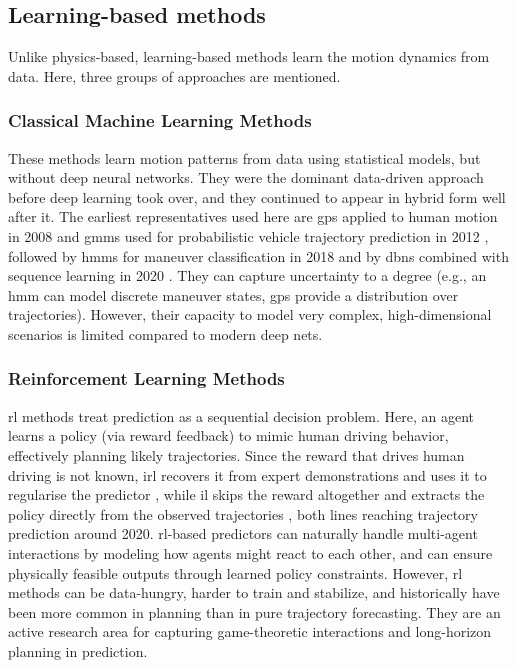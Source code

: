 \subsection{Learning-based methods}
\label{subsec:sota-learning}

Unlike physics-based, learning-based methods learn the motion dynamics from data.
Here, three groups of approaches are mentioned. 

\subsubsection{Classical Machine Learning Methods}
\label{subsec:sota-classical-ml}
These methods learn motion patterns from data using statistical models, but without deep
neural networks. They were the dominant data-driven approach before deep learning took over, and they
continued to appear in hybrid form well after it. The earliest representatives used here are \acp{gp}
applied to human motion in 2008 \cite{Wang2008GPDM} and \acp{gmm} used for probabilistic vehicle
trajectory prediction in 2012 \cite{Wiest2012GMM}, followed by \acp{hmm} for maneuver classification in
2018 \cite{Deo2018Maneuver} and by \acp{dbn} combined with sequence learning in 2020
\cite{Li2020Pedestrian}. They can capture
uncertainty to a degree (e.g., an \ac{hmm} can model discrete maneuver states, \acp{gp}
provide a distribution over trajectories). However, their
capacity to model very complex, high-dimensional scenarios is limited compared to modern
deep nets.

\subsubsection{Reinforcement Learning Methods}
\label{subsec:sota-rl}

\Ac{rl} methods treat prediction as a sequential decision problem. Here, an agent learns a
policy (via reward feedback) to mimic human driving behavior, effectively planning likely
trajectories. Since the reward that drives human driving is not known, \ac{irl}
recovers it from expert demonstrations and uses it to regularise the predictor \cite{Choi2020IRL}, while
\ac{il} skips the reward altogether and extracts the policy directly from the observed
trajectories \cite{Qi2020Imitative}, both lines reaching trajectory prediction around 2020.
\Ac{rl}-based predictors can naturally handle multi-agent interactions by
modeling how agents might react to each other, and can ensure physically feasible outputs through learned
policy constraints. However, \ac{rl} methods can be data-hungry, harder to train and stabilize, and
historically have been more common in planning than in pure trajectory forecasting. They are
an active research area for capturing game-theoretic interactions and long-horizon planning in
prediction.

